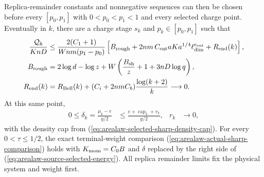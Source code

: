 \begin{lemma}
    Replica-remainder constants and nonnegative sequences can then be
    chosen before every $[p_0,p_1]$ with $0<p_0<p_1<1$ and every selected charge
    point. Eventually in $k$, there are a charge stage $s_k$ and
    $p_k\in[p_0,p_1]$ such that
    \begin{align}
        \frac{\mathcal Q_k}{KnD}
         & \le\frac{2(C_1+1)}{Wnm(p_1-p_0)}
        \left[B_{\rm rough}
            +2nm\,C_{\rm ent}aK a^{1/4}\ell_{\dim}^{e_{\rm ent}}
        +R_{\rm end}(k)\right],\nonumber                                          \\
        B_{\rm rough}
         & =2\log d-\log z+W\left(\frac{B_{\rm sh}}z+1+3nD\log q\right),\nonumber \\
        R_{\rm end}(k)
         & =R_{\rm Bell}(k)+(C_i+2nmC_b)\frac{\log(k+2)}k
        \longrightarrow0.
        \label{eq:arealaw-source-selected-density}
    \end{align}
    At this same point,
    \begin{align}
        0\le\delta_k=\frac{\mu_k-e}{g/2}
         & \le\frac{e+\operatorname{cap}_k+r_k}{g/2}, & r_k & \longrightarrow0,
        \label{eq:arealaw-source-selected-energy}
    \end{align}
    with the density cap from
    (\ref{eq:arealaw-selected-sharp-density-cap}). For every
    $0<\tau\le1/2$, the exact terminal-weight comparison
    (\ref{eq:arealaw-actual-sharp-comparison}) holds with
    $K_{\rm mom}=C_0B$ and $\delta$ replaced by the right side of
    (\ref{eq:arealaw-source-selected-energy}). All replica
    remainder limits fix the physical system and weight first.
\end{lemma}

